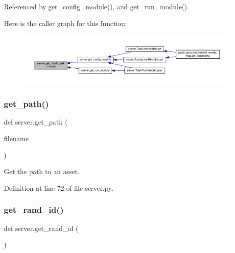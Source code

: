 Referenced by get\+\_\+config\+\_\+module(), and get\+\_\+run\+\_\+module().

Here is the caller graph for this function\+:
\nopagebreak
\begin{figure}[H]
\begin{center}
\leavevmode
\includegraphics[width=350pt]{namespaceserver_a20f5670b2d0cc9c06be867b56798550d_icgraph}
\end{center}
\end{figure}
\mbox{\label{namespaceserver_aa8c035a44061d07462939492cd21b0b8}} 
\subsubsection{\texorpdfstring{get\+\_\+path()}{get\_path()}}
{\footnotesize\ttfamily def server.\+get\+\_\+path (\begin{DoxyParamCaption}\item[{}]{filename }\end{DoxyParamCaption})}

\begin{DoxyVerb}Get the path to an asset.\end{DoxyVerb}
 

Definition at line 72 of file server.\+py.

\mbox{\label{namespaceserver_a2cde4e039120e25dbaa04e72af4683a3}} 
\subsubsection{\texorpdfstring{get\+\_\+rand\+\_\+id()}{get\_rand\_id()}}
{\footnotesize\ttfamily def server.\+get\+\_\+rand\+\_\+id (\begin{DoxyParamCaption}{ }\end{DoxyParamCaption})}



